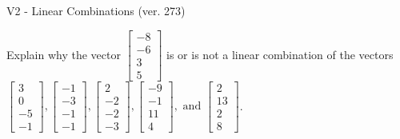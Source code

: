 \begin{exercise}
  \begin{exerciseTitle}V2 - Linear Combinations (ver. 273)\end{exerciseTitle}
  \begin{exerciseStatement}
    Explain why the vector \(\left[\begin{array}{c}
-8 \\
-6 \\
3 \\
5
\end{array}\right]\)  is or is not a linear 
	combination of the vectors \(\left[\begin{array}{c}
3 \\
0 \\
-5 \\
-1
\end{array}\right] , \left[\begin{array}{c}
-1 \\
-3 \\
-1 \\
-1
\end{array}\right] , \left[\begin{array}{c}
2 \\
-2 \\
-2 \\
-3
\end{array}\right] , \left[\begin{array}{c}
-9 \\
-1 \\
11 \\
4
\end{array}\right] , \text{ and } \left[\begin{array}{c}
2 \\
13 \\
2 \\
8
\end{array}\right]\).
	



\end{exerciseStatement}
\end{exercise}
